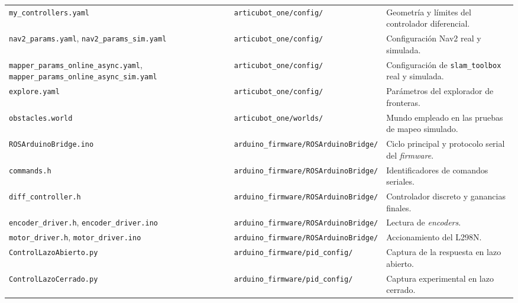 \begin{appendices}
\begin{longtable}{p{4.5cm} p{4.0cm} p{5.0cm}}
\texttt{my\_\allowbreak{}controllers.\allowbreak{}yaml} & \texttt{articubot\_\allowbreak{}one/\allowbreak{}config/} & Geometría y límites del controlador diferencial. \\
\texttt{nav2\_\allowbreak{}params.\allowbreak{}yaml}, \texttt{nav2\_\allowbreak{}params\_\allowbreak{}sim.\allowbreak{}yaml} & \texttt{articubot\_\allowbreak{}one/\allowbreak{}config/} & Configuración Nav2 real y simulada. \\
\texttt{mapper\_\allowbreak{}params\_\allowbreak{}online\_\allowbreak{}async.\allowbreak{}yaml}, \texttt{mapper\_\allowbreak{}params\_\allowbreak{}online\_\allowbreak{}async\_\allowbreak{}sim.\allowbreak{}yaml} & \texttt{articubot\_\allowbreak{}one/\allowbreak{}config/} & Configuración de \texttt{slam\_toolbox} real y simulada. \\
\texttt{explore.\allowbreak{}yaml} & \texttt{articubot\_\allowbreak{}one/\allowbreak{}config/} & Parámetros del explorador de fronteras. \\
\texttt{obstacles.\allowbreak{}world} & \texttt{articubot\_\allowbreak{}one/\allowbreak{}worlds/} & Mundo empleado en las pruebas de mapeo simulado. \\
\texttt{ROSArduinoBridge.\allowbreak{}ino} & \texttt{arduino\_\allowbreak{}firmware/\allowbreak{}ROSArduinoBridge/} & Ciclo principal y protocolo serial del \textit{firmware}. \\
\texttt{commands.\allowbreak{}h} & \texttt{arduino\_\allowbreak{}firmware/\allowbreak{}ROSArduinoBridge/} & Identificadores de comandos seriales. \\
\texttt{diff\_\allowbreak{}controller.\allowbreak{}h} & \texttt{arduino\_\allowbreak{}firmware/\allowbreak{}ROSArduinoBridge/} & Controlador discreto y ganancias finales. \\
\texttt{encoder\_\allowbreak{}driver.\allowbreak{}h}, \texttt{encoder\_\allowbreak{}driver.\allowbreak{}ino} & \texttt{arduino\_\allowbreak{}firmware/\allowbreak{}ROSArduinoBridge/} & Lectura de \textit{encoders}. \\
\texttt{motor\_\allowbreak{}driver.\allowbreak{}h}, \texttt{motor\_\allowbreak{}driver.\allowbreak{}ino} & \texttt{arduino\_\allowbreak{}firmware/\allowbreak{}ROSArduinoBridge/} & Accionamiento del L298N. \\
\texttt{ControlLazoAbierto.\allowbreak{}py} & \texttt{arduino\_\allowbreak{}firmware/\allowbreak{}pid\_\allowbreak{}config/} & Captura de la respuesta en lazo abierto. \\
\texttt{ControlLazoCerrado.\allowbreak{}py} & \texttt{arduino\_\allowbreak{}firmware/\allowbreak{}pid\_\allowbreak{}config/} & Captura experimental en lazo cerrado. \\

\end{longtable}
\end{appendices}

